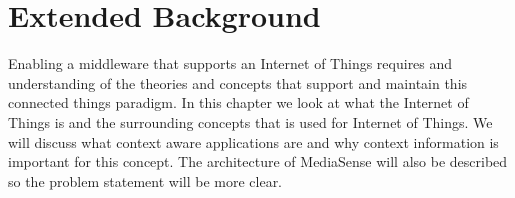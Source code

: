 \chapter{Extended Background}

Enabling a middleware that supports an Internet of Things requires and understanding of the theories and concepts that support and maintain this connected things paradigm. In this chapter we look at what the Internet of Things is and the surrounding concepts that is used for Internet of Things. We will discuss what context aware applications are and why context information is important for this concept. The architecture of MediaSense will also be described so the problem statement will be more clear. 




